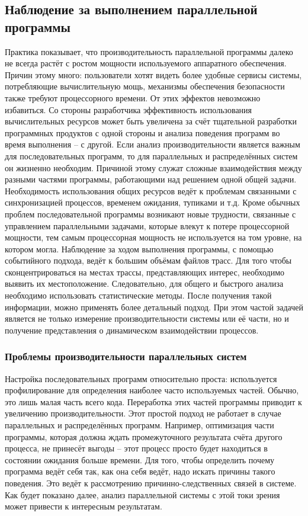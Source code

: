 \subsection{Наблюдение за выполнением параллельной программы}
Практика показывает, что производительность параллельной программы далеко не всегда растёт с ростом мощности используемого аппаратного обеспечения. Причин этому много: пользователи хотят видеть более удобные сервисы системы, потребляющие вычислительную мощь, механизмы обеспечения безопасности также требуют процессорного времени. От этих эффектов невозможно избавиться.
Со стороны разработчика эффективность использования вычислительных ресурсов может быть увеличена за счёт тщательной разработки программных продуктов с одной стороны и анализа поведения программ во время выполнения – с другой. Если анализ производительности является важным для последовательных программ, то для параллельных и распределённых систем он жизненно необходим. Причиной этому служат сложные взаимодействия между разными частями программы, работающими над решением одной общей задачи.
Необходимость использования общих ресурсов ведёт к проблемам связанными с синхронизацией процессов, временем ожидания, тупиками и т.д. Кроме обычных проблем последовательной программы возникают новые трудности, связанные с управлением параллельными задачами, которые влекут к потере процессорной мощности, тем самым  процессорная мощность не используется на том уровне, на котором могла.
Наблюдение за ходом выполнения программы, с помощью событийного подхода, ведёт к большим объёмам файлов трасс. Для того чтобы сконцентрироваться на местах трассы, представляющих интерес, необходимо выявить их местоположение. Следовательно, для общего и быстрого анализа необходимо использовать статистические методы. После получения такой информации, можно применять более детальный подход. При этом частой задачей является не только измерение производительности системы или её части, но и получение представления о динамическом взаимодействии процессов.
\subsubsection{Проблемы производительности параллельных систем}
Настройка последовательных программ относительно проста: используется профилирование для определения наиболее часто используемых частей. Обычно, это лишь малая часть всего кода. Переработка этих частей программы приводит к увеличению производительности. Этот простой подход не работает в случае параллельных и распределённых программ. Например, оптимизация части программы, которая должна ждать промежуточного результата счёта другого процесса, не принесёт выгоды – этот процесс просто будет находиться в состоянии ожидания больше времени. Для того, чтобы определить почему программа ведёт себя так, как она себя ведёт, надо искать причины такого поведения. Это ведёт к рассмотрению причинно-следственных связей в системе. Как будет показано далее, анализ параллельной системы с этой токи зрения может привести к интересным результатам.
